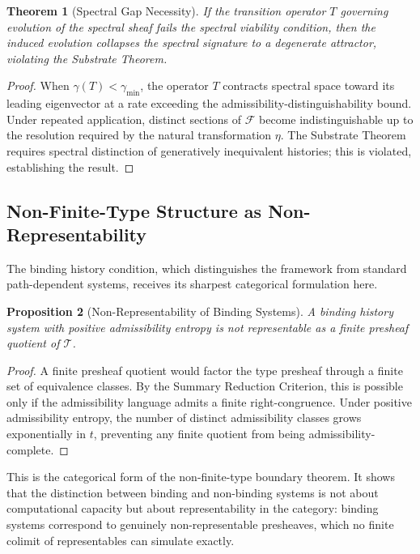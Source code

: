 \documentclass[12pt, a4paper]{article}
\theoremstyle{plain}
\newtheorem{theorem}{Theorem}[section]
\newtheorem{proposition}[theorem]{Proposition}
\theoremstyle{definition}
\theoremstyle{remark}
\begin{document}
\begin{theorem}[Spectral Gap Necessity]
If the transition operator $T$ governing evolution of the spectral sheaf fails the spectral viability condition, then the induced evolution collapses the spectral signature to a degenerate attractor, violating the Substrate Theorem.
\end{theorem}

\begin{proof}
When $\gamma(T) < \gamma_{\min}$, the operator $T$ contracts spectral space toward its leading eigenvector at a rate exceeding the admissibility-distinguishability bound. Under repeated application, distinct sections of $\mathcal{F}$ become indistinguishable up to the resolution required by the natural transformation $\eta$. The Substrate Theorem requires spectral distinction of generatively inequivalent histories; this is violated, establishing the result.
\end{proof}

\subsection{Non-Finite-Type Structure as Non-Representability}

The binding history condition, which distinguishes the framework from standard path-dependent systems, receives its sharpest categorical formulation here.

\begin{proposition}[Non-Representability of Binding Systems]
A binding history system with positive admissibility entropy is not representable as a finite presheaf quotient of $\mathcal{T}$.
\end{proposition}

\begin{proof}
A finite presheaf quotient would factor the type presheaf through a finite set of equivalence classes. By the Summary Reduction Criterion, this is possible only if the admissibility language admits a finite right-congruence. Under positive admissibility entropy, the number of distinct admissibility classes grows exponentially in $t$, preventing any finite quotient from being admissibility-complete.
\end{proof}

This is the categorical form of the non-finite-type boundary theorem. It shows that the distinction between binding and non-binding systems is not about computational capacity but about representability in the category: binding systems correspond to genuinely non-representable presheaves, which no finite colimit of representables can simulate exactly.
\end{document}
